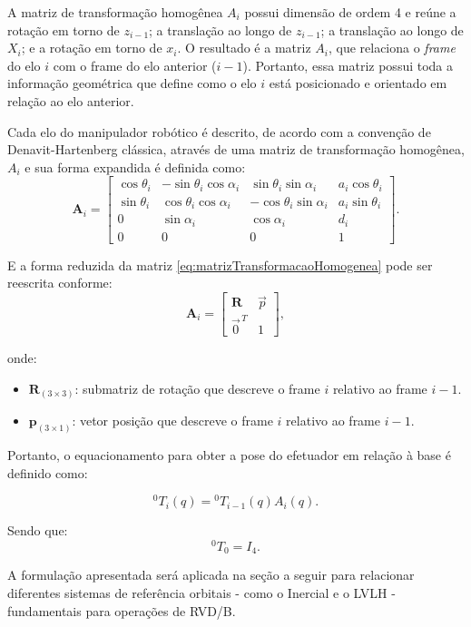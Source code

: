 A matriz de transformação homogênea $A_i$ possui dimensão de ordem 4 e reúne a rotação em torno de $z_{i-1}$;
a translação ao longo de $z_{i-1}$;
a translação ao longo de $X_{i}$;
e a rotação em torno de $x_{i}$.
O resultado é a matriz $A_i$, que relaciona o \emph{frame} do elo $i$ com o frame do elo anterior ($i-1$).
Portanto, essa matriz possui toda a informação geométrica que define como o elo $i$ está posicionado e orientado em relação ao elo anterior.

Cada elo do manipulador robótico é descrito, de acordo com a convenção de Denavit-Hartenberg clássica, através de uma matriz de transformação homogênea, $A_i$ e sua forma expandida é definida como:
\begin{equation}
    \label{eq:matrizTransformacaoHomogenea}
\mathbf{A}_i =
\begin{bmatrix}
\cos\theta_i & -\sin\theta_i \cos\alpha_i &
\sin\theta_i \sin\alpha_i & a_i \cos\theta_i \\
\sin\theta_i & \cos\theta_i \cos\alpha_i  &
-\cos\theta_i \sin\alpha_i & a_i \sin\theta_i \\
0 & \sin\alpha_i & \cos\alpha_i & d_i \\
0 & 0 & 0 & 1
\end{bmatrix}.
\end{equation}

E a forma reduzida da matriz \eqref{eq:matrizTransformacaoHomogenea} pode ser reescrita conforme:
\begin{equation}
\label{eq:matrizTransformacaoHomogenea_reduzida}
\mathbf{A}_i = 
\begin{bmatrix}
\mathbf{R} & \vec{p} \\
\vec{0}^{\,T} & 1
\end{bmatrix},
\end{equation}

onde:
\begin{itemize}
    \item $\mathbf{R}_{(3\times 3)}$: submatriz de rotação que descreve o frame $i$ relativo ao frame $i-1$.
    \item $\mathbf{p}_{(3\times 1)}$: vetor posição que descreve  o frame $i$ relativo ao frame $i-1$.
\end{itemize}

Portanto, o equacionamento para obter a pose do efetuador em relação à base é definido como:

\begin{equation}
{}^{0}\!T_i(q)=
{}^{0}\!T_{i-1}(q)
A_i(q).
\end{equation}

Sendo que:
\begin{equation}
{}^{0}\!T_0 = I_{4}.
\end{equation}

A formulação apresentada será aplicada na seção a seguir para relacionar diferentes sistemas de referência orbitais - como o Inercial e o LVLH - fundamentais para operações de RVD/B.

